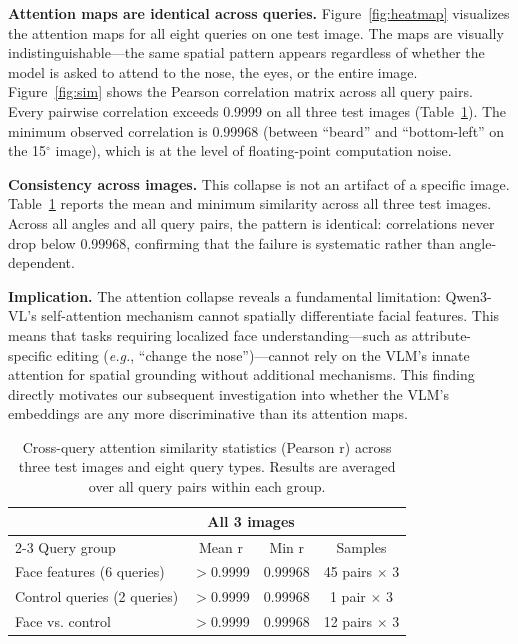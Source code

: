 \documentclass[10pt,twocolumn,letterpaper]{article}
\begin{document}
\textbf{Attention maps are identical across queries.} Figure~\ref{fig:heatmap} visualizes the attention maps for all eight queries on one test image. The maps are visually indistinguishable---the same spatial pattern appears regardless of whether the model is asked to attend to the nose, the eyes, or the entire image. Figure~\ref{fig:sim} shows the Pearson correlation matrix across all query pairs. Every pairwise correlation exceeds 0.9999 on all three test images (Table~\ref{tab:sim_stats}). The minimum observed correlation is 0.99968 (between ``beard'' and ``bottom-left'' on the 15$^\circ$ image), which is at the level of floating-point computation noise.

\textbf{Consistency across images.} This collapse is not an artifact of a specific image. Table~\ref{tab:sim_stats} reports the mean and minimum similarity across all three test images. Across all angles and all query pairs, the pattern is identical: correlations never drop below 0.99968, confirming that the failure is systematic rather than angle-dependent.

\textbf{Implication.} The attention collapse reveals a fundamental limitation: Qwen3-VL's self-attention mechanism cannot spatially differentiate facial features. This means that tasks requiring localized face understanding---such as attribute-specific editing (\emph{e.g.}, ``change the nose'')---cannot rely on the VLM's innate attention for spatial grounding without additional mechanisms. This finding directly motivates our subsequent investigation into whether the VLM's embeddings are any more discriminative than its attention maps.

\begin{table}[t]
\centering
\caption{Cross-query attention similarity statistics (Pearson r) across three test images and eight query types. Results are averaged over all query pairs within each group.}
\label{tab:sim_stats}
\begin{tabular}{lccc}
\toprule
 & \multicolumn{2}{c}{All 3 images} & \\
\cmidrule{2-3}
Query group & Mean r & Min r & Samples \\
\midrule
Face features (6 queries) & $>$0.9999 & 0.99968 & 45 pairs $\times$ 3 \\
Control queries (2 queries) & $>$0.9999 & 0.99968 & 1 pair $\times$ 3 \\
Face vs. control & $>$0.9999 & 0.99968 & 12 pairs $\times$ 3 \\
\bottomrule
\end{tabular}
\end{table}
\end{document}
